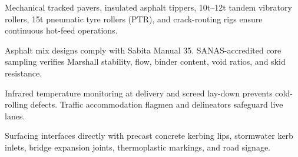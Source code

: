 \documentclass[a4paper,11pt]{article}
\begin{document}
\noindent
\begin{minipage}[t]{0.485\textwidth}
    \begin{tcolorbox}[enhanced, colback=white, colframe=mhlightgray, boxrule=0.8pt, arc=4pt, title={\bfseries\color{white}\faTruckMonster\ Surfacing Plant Logistics}, colbacktitle=mhnavy, left=8pt, right=8pt, top=7pt, bottom=7pt, drop shadow=black!4]
        {\fontsize{8.1pt}{11.3pt}\selectfont\color{mhtext}
        Mechanical tracked pavers, insulated asphalt tippers, 10t--12t tandem vibratory rollers, 15t pneumatic tyre rollers (PTR), and crack-routing rigs ensure continuous hot-feed operations.
        }
    \end{tcolorbox}
\end{minipage}
\hfill
\begin{minipage}[t]{0.485\textwidth}
    \begin{tcolorbox}[enhanced, colback=white, colframe=mhlightgray, boxrule=0.8pt, arc=4pt, title={\bfseries\color{white}\faFlask\ Laboratory Mix Verification}, colbacktitle=mhblue, left=8pt, right=8pt, top=7pt, bottom=7pt, drop shadow=black!4]
        {\fontsize{8.1pt}{11.3pt}\selectfont\color{mhtext}
        Asphalt mix designs comply with Sabita Manual 35. SANAS-accredited core sampling verifies Marshall stability, flow, binder content, void ratios, and skid resistance.
        }
    \end{tcolorbox}
\end{minipage}

\vspace{0.18cm}

\noindent
\begin{minipage}[t]{0.485\textwidth}
    \begin{tcolorbox}[enhanced, colback=white, colframe=mhlightgray, boxrule=0.8pt, arc=4pt, title={\bfseries\color{white}\faThermometerHalf\ Thermal \& Site Safety Control}, colbacktitle=mhnavy, left=8pt, right=8pt, top=7pt, bottom=7pt, drop shadow=black!4]
        {\fontsize{8.1pt}{11.3pt}\selectfont\color{mhtext}
        Infrared temperature monitoring at delivery and screed lay-down prevents cold-rolling defects. Traffic accommodation flagmen and delineators safeguard live lanes.
        }
    \end{tcolorbox}
\end{minipage}
\hfill
\begin{minipage}[t]{0.485\textwidth}
    \begin{tcolorbox}[enhanced, colback=white, colframe=mhlightgray, boxrule=0.8pt, arc=4pt, title={\bfseries\color{white}\faRoad\ Interfaced Civil Road Scope}, colbacktitle=mhblue, left=8pt, right=8pt, top=7pt, bottom=7pt, drop shadow=black!4]
        {\fontsize{8.1pt}{11.3pt}\selectfont\color{mhtext}
        Surfacing interfaces directly with precast concrete kerbing lips, stormwater kerb inlets, bridge expansion joints, thermoplastic markings, and road signage.
        }
    \end{tcolorbox}
\end{minipage}
\end{document}
